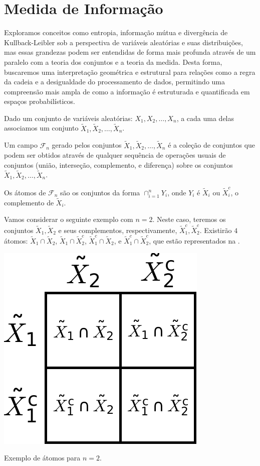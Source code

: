 \section{Medida de Informação}\label{sec:medidasvariacoes}
Exploramos conceitos como entropia, informação mútua e divergência de
Kullback-Leibler sob a perspectiva de variáveis aleatórias e suas
distribuições, mas essas grandezas podem ser entendidas de forma mais profunda
através de um paralelo com a teoria dos conjuntos e a teoria da medida.
Desta forma, buscaremos uma interpretação geométrica e estrutural para relações
como a regra da cadeia e a desigualdade do processamento de dados, permitindo
uma compreensão mais ampla de como a informação é estruturada e quantificada em
espaços probabilísticos.

Dado um conjunto de variáveis aleatórias: $X_1, X_2, \ldots, X_n$,
a cada uma delas associamos um conjunto $\tilde{X}_1, \tilde{X}_2, \ldots, \tilde{X}_n$.

\begin{definition}[Campo]
  Um campo $\mathcal{F}_n$ gerado pelos conjuntos $\tilde{X}_1, \tilde{X}_2, \ldots, \tilde{X}_n$ é
  a coleção de conjuntos que podem ser obtidos através de qualquer sequência de operações
  usuais de conjuntos (união, interseção, complemento, e diferença) sobre os conjuntos
  $\tilde{X}_1, \tilde{X}_2, \ldots, \tilde{X}_n$.
\end{definition}

\begin{definition}[Átomo]
  Os átomos de $\mathcal{F}_n$ são os conjuntos da forma $\cap_{i=1}^n Y_i$, onde
  $Y_i$ é $\tilde{X}_i$ ou $\tilde{X}_i^c$, o complemento de $\tilde{X}_i$.
\end{definition}

\begin{example}
  Vamos considerar o seguinte exemplo com $n=2$.
  Neste caso, teremos os conjuntos $\tilde{X}_1, \tilde{X}_2$ e seus complementos,
  respectivamente, $\tilde{X}_1^c, \tilde{X}_2^c$. Existirão $4$ átomos:
  $\tilde{X}_1 \cap \tilde{X}_2$, $\tilde{X}_1 \cap \tilde{X}_2^c$,
  $\tilde{X}_1^c \cap \tilde{X}_2$, e $\tilde{X}_1^c \cap \tilde{X}_2^c$,
  que estão representados na .
  \begin{marginfigure}%
    \includegraphics[width=0.5\linewidth]{figures/atoms-n2.pdf}
    \caption{Exemplo de átomos para $n=2$.}
    \label{fig:atoms-n2}
  \end{marginfigure}
\end{example}

